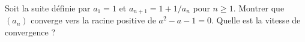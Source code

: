 Soit la suite définie par $a_1 = 1$ et $a_{n+1} = 1 + 1/a_n$ pour $n \geq 1$. Montrer que $(a_n)$ converge vers la racine positive de $a^2 - a - 1 = 0$. Quelle est la vitesse de convergence ?
